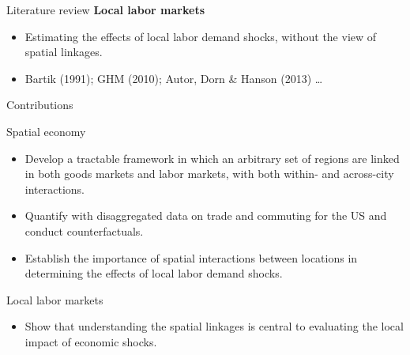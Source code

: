 \documentclass{beamer}
\begin{document}
\begin{frame}{Literature review}
	\textbf{Local labor markets}
	\begin{itemize}
		\item Estimating the effects of local labor demand shocks, without the view of spatial linkages.
		\item Bartik (1991); GHM (2010); Autor, Dorn \& Hanson (2013) \dots
	\end{itemize}
\end{frame}
\begin{frame}{Contributions}
	\begin{block}{Spatial economy}
		\begin{itemize}
			\item Develop a tractable framework in which an arbitrary set of regions are linked in both goods markets and labor markets, with both within- and across-city interactions.
			\item Quantify with disaggregated data on trade and commuting for the US and conduct counterfactuals.
			\item Establish the importance of spatial interactions between locations in determining the effects of local labor demand shocks.
		\end{itemize}
	\end{block}
	\begin{block}{Local labor markets}
		\begin{itemize}
			\item Show that understanding the spatial linkages is central to evaluating the local impact of economic shocks.
		\end{itemize}
	\end{block}
\end{frame}
\end{document}
